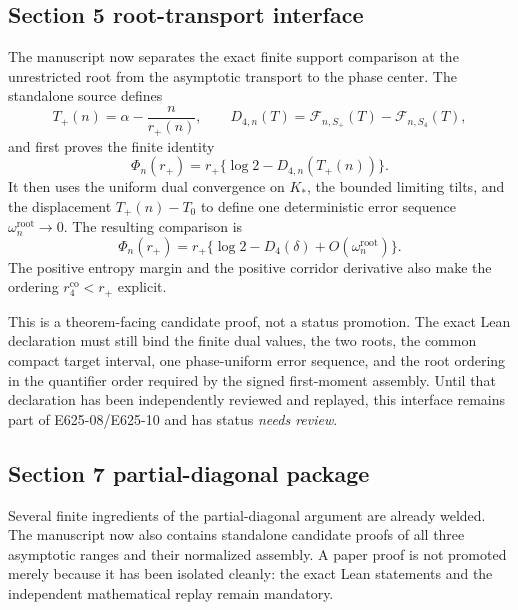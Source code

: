 \subsection{Section 5 root-transport interface}

The manuscript now separates the exact finite support comparison at the
unrestricted root from the asymptotic transport to the phase center. The
standalone source
 defines
\[
  T_+(n)=\alpha-\frac{n}{r_+(n)},
  \qquad
  D_{4,n}(T)=\mathcal F_{n,S_+}(T)-\mathcal F_{n,S_4}(T),
\]
and first proves the finite identity
\[
  \Phi_n(r_+)=r_+\{\log 2-D_{4,n}(T_+(n))\}.
\]
It then uses the uniform dual convergence on $K_*$, the bounded limiting
tilts, and the displacement $T_+(n)-T_0$ to define one deterministic error
sequence $\omega_n^{\mathrm{root}}\to0$. The resulting comparison is
\[
  \Phi_n(r_+)
  =r_+\{\log 2-D_4(\delta)+O(\omega_n^{\mathrm{root}})\}.
\]
The positive entropy margin and the positive corridor derivative also make the
ordering $r_4^{\mathrm{co}}<r_+$ explicit.

This is a theorem-facing candidate proof, not a status promotion. The exact
Lean declaration must still bind the finite dual values, the two roots, the
common compact target interval, one phase-uniform error sequence, and the root
ordering in the quantifier order required by the signed first-moment assembly.
Until that declaration has been independently reviewed and replayed, this
interface remains part of E625-08/E625-10 and has status \emph{needs review}.

\subsection{Section 7 partial-diagonal package}

Several finite ingredients of the partial-diagonal argument are already
welded. The manuscript now also contains standalone candidate proofs of all
three asymptotic ranges and their normalized assembly. A paper proof is not
promoted merely because it has been isolated cleanly: the exact Lean statements
and the independent mathematical replay remain mandatory.

